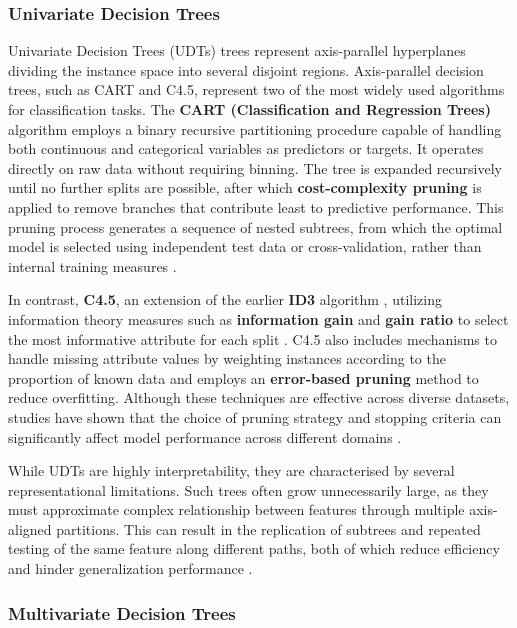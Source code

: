 \subsubsection{Univariate Decision Trees}\label{univariate-decision-trees}

Univariate Decision Trees (UDTs) trees represent axis-parallel hyperplanes dividing the instance space into several disjoint regions. Axis-parallel decision trees, such as CART and C4.5, represent two of the most widely used algorithms for classification tasks. The \textbf{CART (Classification and Regression Trees)} algorithm employs a binary recursive partitioning procedure capable of handling both continuous and categorical variables as predictors or targets. It operates directly on raw data without requiring binning. The tree is expanded recursively until no further splits are possible, after which \textbf{cost-complexity pruning} is applied to remove branches that contribute least to predictive performance. This pruning process generates a sequence of nested subtrees, from which the optimal model is selected using independent test data or cross-validation, rather than internal training measures \citep{breiman1984}.

In contrast, \textbf{C4.5}, an extension of the earlier \textbf{ID3} algorithm \citep{quinlan1986}, utilizing information theory measures such as \textbf{information gain} and \textbf{gain ratio} to select the most informative attribute for each split \citep{quinlan1993}. C4.5 also includes mechanisms to handle missing attribute values by weighting instances according to the proportion of known data and employs an \textbf{error-based pruning} method to reduce overfitting. Although these techniques are effective across diverse datasets, studies have shown that the choice of pruning strategy and stopping criteria can significantly affect model performance across different domains \citep{mingers1989, schaffer1992}.

While UDTs are highly interpretability, they are characterised by several representational limitations. Such trees often grow unnecessarily large, as they must approximate complex relationship between features through multiple axis-aligned partitions. This can result in the replication of subtrees and repeated testing of the same feature along different paths, both of which reduce efficiency and hinder generalization performance \citep{pagallo1990}.

\subsubsection{Multivariate Decision Trees}\label{multivariate-decision-trees}

